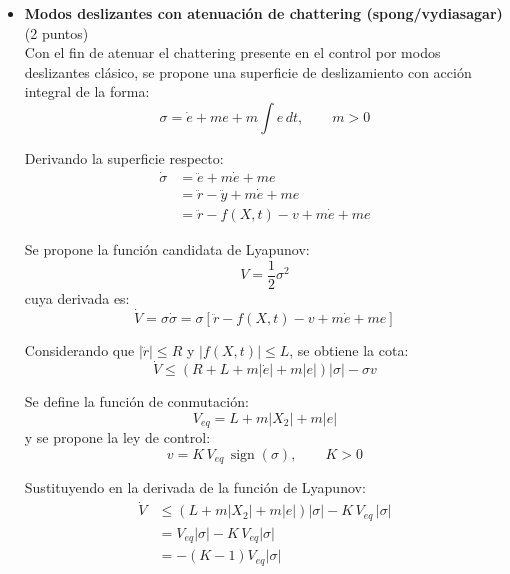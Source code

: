 \begin{enumerate}
\begin{itemize}
        \item \textbf{Modos deslizantes con atenuación de chattering (spong/vydiasagar)} (2 puntos)\\

        Con el fin de atenuar el chattering presente en el control por modos deslizantes clásico, se propone una superficie de deslizamiento con acción integral de la forma:
        \begin{equation*}
            \sigma = \dot{e} + m e + m \int e \, dt,\qquad m>0
        \end{equation*}

        Derivando la superficie respecto:
        \begin{equation*}
            \begin{aligned}
                \dot{\sigma} &= \ddot{e} + m\dot{e} + m e \\
                &= \ddot{r} - \ddot{y} + m\dot{e} + m e \\
                &= \ddot{r} - f(X,t) - v + m\dot{e} + m e
            \end{aligned}
        \end{equation*}

        Se propone la función candidata de Lyapunov:
        \begin{equation*}
            V = \frac{1}{2}\sigma^2
        \end{equation*}
        cuya derivada es:
        \begin{equation*}
            \dot{V} = \sigma\dot{\sigma} = \sigma\left[\ddot{r} - f(X,t) - v + m\dot{e} + m e\right]
        \end{equation*}

        Considerando que $|\ddot{r}|\le R$ y $|f(X,t)|\le L$, se obtiene la cota:
        \begin{equation*}
            \dot{V}\le \left(R+L+m|\dot{e}|+m|e|\right)|\sigma|-\sigma v
        \end{equation*}

        Se define la función de conmutación:
        \begin{equation*}
            V_{eq} = L + m|X_2| + m|e|
        \end{equation*}
        y se propone la ley de control:
        \begin{equation*}
            v = K\,V_{eq}\,\operatorname{sign}(\sigma),\qquad K>0
        \end{equation*}

        Sustituyendo en la derivada de la función de Lyapunov:
        \begin{equation*}
            \begin{aligned}
                \dot{V} &\le (L+m|X_2|+m|e|)|\sigma| - K\,V_{eq}\,|\sigma| \\
                &= V_{eq}|\sigma| - K\,V_{eq}|\sigma| \\
                &= -(K-1)V_{eq}|\sigma|
            \end{aligned}
        \end{equation*}


\end{itemize}
\end{enumerate}
